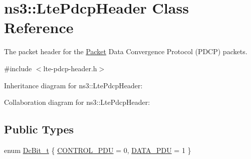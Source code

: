 \hypertarget{classns3_1_1LtePdcpHeader}{}\section{ns3\+:\+:Lte\+Pdcp\+Header Class Reference}
\label{classns3_1_1LtePdcpHeader}


The packet header for the \hyperlink{classns3_1_1Packet}{Packet} Data Convergence Protocol (P\+D\+CP) packets.  




{\ttfamily \#include $<$lte-\/pdcp-\/header.\+h$>$}



Inheritance diagram for ns3\+:\+:Lte\+Pdcp\+Header\+:


Collaboration diagram for ns3\+:\+:Lte\+Pdcp\+Header\+:
\subsection*{Public Types}
\begin{DoxyCompactItemize}
\item 
enum \hyperlink{classns3_1_1LtePdcpHeader_a3a965023a8f37aad003904c3d64d7ffd}{Dc\+Bit\+\_\+t} \{ \hyperlink{classns3_1_1LtePdcpHeader_a3a965023a8f37aad003904c3d64d7ffda2e4b039fbca01a845596f2baaec3d79d}{C\+O\+N\+T\+R\+O\+L\+\_\+\+P\+DU} = 0, 
\hyperlink{classns3_1_1LtePdcpHeader_a3a965023a8f37aad003904c3d64d7ffda5cd4f8c2bc8e87cfae1e626fef42c3d7}{D\+A\+T\+A\+\_\+\+P\+DU} = 1
 \}
\end{DoxyCompactItemize}
